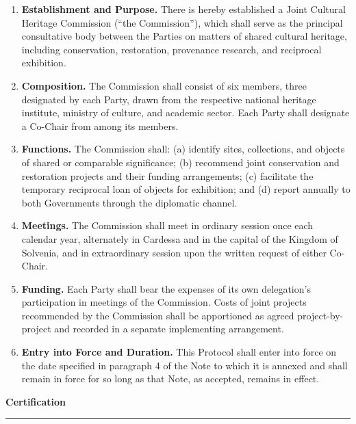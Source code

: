 \documentclass[%
  fontsize=11pt,
  paper=a4,
  parskip=half,
  fromalign=false,
  fromrule=false,
  fromphone=false,
  fromfax=false,
  fromemail=false,
  fromurl=false,
  addrfield=true,
  backaddress=false,
  subject=titled,
  foldmarks=false,
  refline=narrow,
  enlargefirstpage=false,
  pagenumber=botcenter
]{scrlttr2}
\begin{document}
\begin{enumerate}[label=\textbf{\color{noteblue}Article \arabic*.},
  leftmargin=2.4cm,itemsep=8pt,topsep=6pt]

\item \textbf{Establishment and Purpose.} There is hereby established a
Joint Cultural Heritage Commission (\textquotedblleft the
Commission\textquotedblright), which shall serve as the principal
consultative body between the Parties on matters of shared cultural
heritage, including conservation, restoration, provenance research, and
reciprocal exhibition.

\item \textbf{Composition.} The Commission shall consist of six members,
three designated by each Party, drawn from the respective national heritage
institute, ministry of culture, and academic sector. Each Party shall
designate a Co-Chair from among its members.

\item \textbf{Functions.} The Commission shall: (a) identify sites,
collections, and objects of shared or comparable significance; (b) recommend
joint conservation and restoration projects and their funding arrangements;
(c) facilitate the temporary reciprocal loan of objects for exhibition; and
(d) report annually to both Governments through the diplomatic channel.

\item \textbf{Meetings.} The Commission shall meet in ordinary session once
each calendar year, alternately in Cardessa and in the capital of the
Kingdom of Solvenia, and in extraordinary session upon the written request
of either Co-Chair.

\item \textbf{Funding.} Each Party shall bear the expenses of its own
delegation's participation in meetings of the Commission. Costs of joint
projects recommended by the Commission shall be apportioned as agreed
project-by-project and recorded in a separate implementing arrangement.

\item \textbf{Entry into Force and Duration.} This Protocol shall enter into
force on the date specified in paragraph 4 of the Note to which it is
annexed and shall remain in force for so long as that Note, as accepted,
remains in effect.

\end{enumerate}

\vspace{6mm}
\begin{center}
  {\color{noteblue}\sffamily\Large\textbf{Certification}}\\[2pt]
  {\color{notegold}\rule{4.2cm}{0.6pt}}
\end{center}
\end{document}

